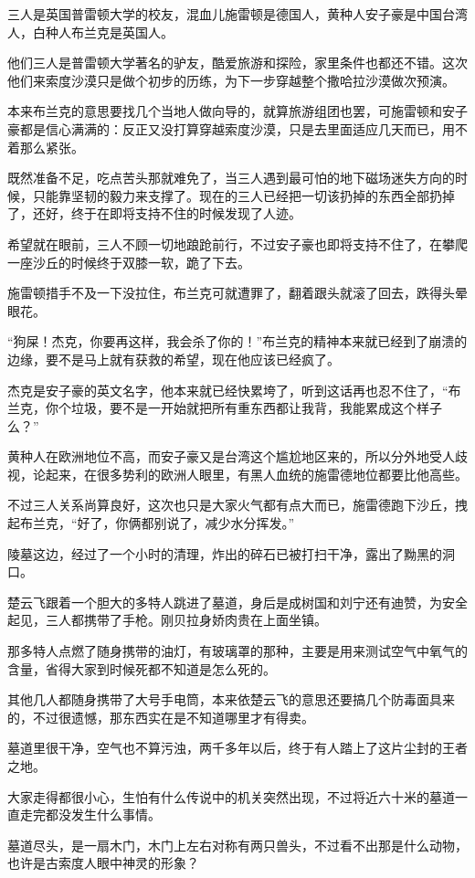 三人是英国普雷顿大学的校友，混血儿施雷顿是德国人，黄种人安子豪是中国台湾人，白种人布兰克是英国人。

他们三人是普雷顿大学著名的驴友，酷爱旅游和探险，家里条件也都还不错。这次他们来索度沙漠只是做个初步的历练，为下一步穿越整个撒哈拉沙漠做次预演。

本来布兰克的意思要找几个当地人做向导的，就算旅游组团也罢，可施雷顿和安子豪都是信心满满的：反正又没打算穿越索度沙漠，只是去里面适应几天而已，用不着那么紧张。

既然准备不足，吃点苦头那就难免了，当三人遇到最可怕的地下磁场迷失方向的时候，只能靠坚韧的毅力来支撑了。现在的三人已经把一切该扔掉的东西全部扔掉了，还好，终于在即将支持不住的时候发现了人迹。

希望就在眼前，三人不顾一切地踉跄前行，不过安子豪也即将支持不住了，在攀爬一座沙丘的时候终于双膝一软，跪了下去。

施雷顿措手不及一下没拉住，布兰克可就遭罪了，翻着跟头就滚了回去，跌得头晕眼花。

“狗屎！杰克，你要再这样，我会杀了你的！”布兰克的精神本来就已经到了崩溃的边缘，要不是马上就有获救的希望，现在他应该已经疯了。

杰克是安子豪的英文名字，他本来就已经快累垮了，听到这话再也忍不住了，“布兰克，你个垃圾，要不是一开始就把所有重东西都让我背，我能累成这个样子么？”

黄种人在欧洲地位不高，而安子豪又是台湾这个尴尬地区来的，所以分外地受人歧视，论起来，在很多势利的欧洲人眼里，有黑人血统的施雷德地位都要比他高些。

不过三人关系尚算良好，这次也只是大家火气都有点大而已，施雷德跑下沙丘，拽起布兰克，“好了，你俩都别说了，减少水分挥发。”

陵墓这边，经过了一个小时的清理，炸出的碎石已被打扫干净，露出了黝黑的洞口。

楚云飞跟着一个胆大的多特人跳进了墓道，身后是成树国和刘宁还有迪赞，为安全起见，三人都携带了手枪。刚贝拉身娇肉贵在上面坐镇。

那多特人点燃了随身携带的油灯，有玻璃罩的那种，主要是用来测试空气中氧气的含量，省得大家到时候死都不知道是怎么死的。

其他几人都随身携带了大号手电筒，本来依楚云飞的意思还要搞几个防毒面具来的，不过很遗憾，那东西实在是不知道哪里才有得卖。

墓道里很干净，空气也不算污浊，两千多年以后，终于有人踏上了这片尘封的王者之地。

大家走得都很小心，生怕有什么传说中的机关突然出现，不过将近六十米的墓道一直走完都没发生什么事情。

墓道尽头，是一扇木门，木门上左右对称有两只兽头，不过看不出那是什么动物，也许是古索度人眼中神灵的形象？

